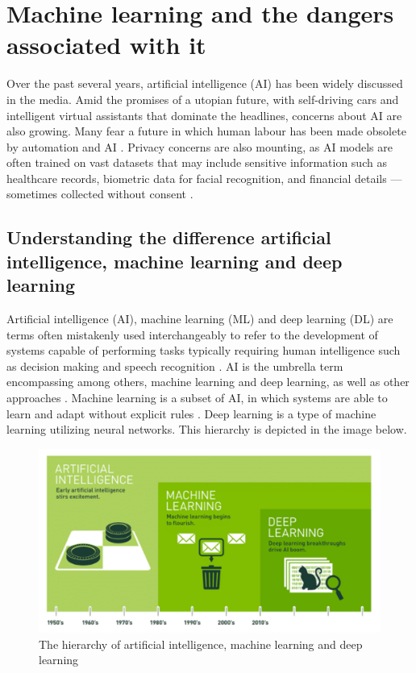 \documentclass[licencjacka,en]{pracamgr}
\begin{document}
\chapter{Machine learning and the dangers associated with it}

Over the past several years, artificial intelligence (AI) has been widely discussed in the media. Amid the promises of a utopian future, with self-driving cars and intelligent virtual assistants that dominate the headlines, concerns about AI are also growing. Many fear a future in which human labour has been made obsolete by automation and AI \cite{francuz_1}. Privacy concerns are also mounting, as AI models are often trained on vast datasets that may include sensitive information such as healthcare records, biometric data for facial recognition, and financial details — sometimes collected without consent \cite{ibm_privacy}. 

\section{Understanding the difference artificial intelligence, machine learning and deep learning}
Artificial intelligence (AI), machine learning (ML) and deep learning (DL) are terms often mistakenly used interchangeably to refer to the development of systems capable of performing tasks typically requiring human intelligence such as decision making and speech recognition \cite{ibm_ai}. AI is the umbrella term encompassing among others, machine learning and deep learning, as well as other approaches \cite{francuz_2}. Machine learning is a subset of AI, in which systems are able to learn and adapt without explicit rules \cite{ibm_ai}. Deep learning is a type of machine learning utilizing neural networks. This hierarchy is depicted in the image below.

\begin{figure}
    \centering
    \includegraphics[width=0.5\linewidth]{bachelor_images/nvidia_ai_hierarchy.png}
    \caption{The hierarchy of artificial intelligence, machine learning and deep learning \cite{nvidiaimage}}
    \label{fig:hierarchy-ai-ml-dl}
\end{figure}
\end{document}
